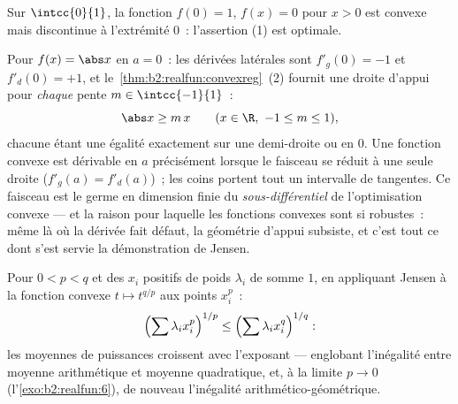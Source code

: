 \begin{example}
Sur $\intcc{0}{1}$, la fonction $f(0) = 1$, $f(x) = 0$ pour $x > 0$
est convexe mais discontinue à l'extrémité $0$~: l'assertion (1) est
optimale.
\end{example}

\begin{example}\label{ex:b2:realfun:corner}
Pour $f(x) = \abs x$ en $a = 0$~: les dérivées latérales sont
$f'_g(0) = -1$ et $f'_d(0) = +1$, et
le~\cref{thm:b2:realfun:convexreg}~(2) fournit une droite d'appui
pour \emph{chaque} pente $m \in \intcc{-1}{1}$~:
\[
\abs x \geq m\,x \qquad (x \in \R,\ -1 \leq m \leq 1),
\]
chacune étant une égalité exactement sur une demi-droite ou en $0$.
Une fonction convexe est dérivable en $a$ précisément lorsque le
faisceau se réduit à une seule droite ($f'_g(a) = f'_d(a)$)~; les
coins portent tout un intervalle de tangentes. Ce faisceau est le
germe en dimension finie du \emph{sous-différentiel} de
l'optimisation convexe --- et la raison pour laquelle les fonctions
convexes sont si robustes~: même là où la dérivée fait défaut, la
géométrie d'appui subsiste, et c'est tout ce dont s'est servie la
démonstration de Jensen.
\end{example}

\begin{example}\label{ex:b2:realfun:powermeans}
Pour $0 < p < q$ et des $x_i$ positifs de poids $\lambda_i$ de somme
$1$, en appliquant Jensen à la fonction convexe $t \mapsto t^{q/p}$
aux points $x_i^p$~:
\[
\Bigl(\sum \lambda_i x_i^{p}\Bigr)^{1/p}
\leq \Bigl(\sum \lambda_i x_i^{q}\Bigr)^{1/q} :
\]
les moyennes de puissances croissent avec l'exposant --- englobant
l'inégalité entre moyenne arithmétique et moyenne quadratique, et, à
la limite $p \to 0$ (l'\cref{exo:b2:realfun:6}), de nouveau
l'inégalité arithmético-géométrique.
\end{example}

